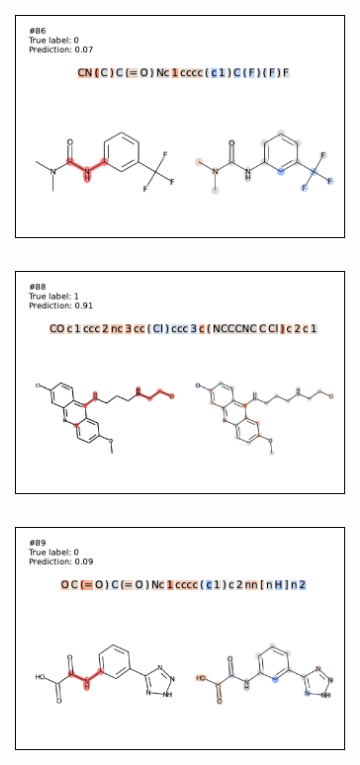 \begin{figure}
\begin{subfigure}[b]{0.33\textwidth}
\end{subfigure} 
\begin{subfigure}[b]{0.33\textwidth} 
  \centering 
  \includegraphics[width=\textwidth]{figures/ames/ames86.pdf} 
\end{subfigure}\begin{subfigure}[b]{0.33\textwidth} 
  \centering 
  \includegraphics[width=\textwidth]{figures/ames/ames88.pdf} 
\end{subfigure}\begin{subfigure}[b]{0.33\textwidth} 
  \centering 
  \includegraphics[width=\textwidth]{figures/ames/ames89.pdf} 

\end{subfigure}
\end{figure}
